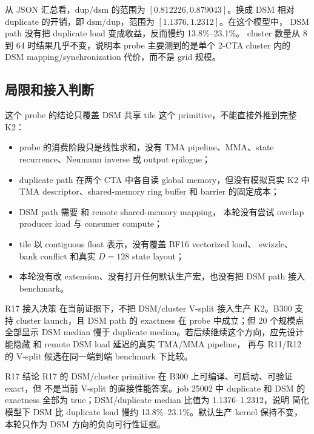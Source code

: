 从 JSON 汇总看，\(\mathrm{dup}/\mathrm{dsm}\) 的范围为
\([0.812226,0.879043]\)。换成 DSM 相对 duplicate 的开销，即
\(\mathrm{dsm}/\mathrm{dup}\)，范围为 \([1.1376,1.2312]\)。在这个模型中，
DSM path 没有把 duplicate load 变成收益，反而慢约 13.8\%--23.1\%。
cluster 数量从 8 到 64 时结果几乎不变，说明本 probe 主要测到的是单个
2-CTA cluster 内的 DSM mapping/synchronization 代价，而不是 grid 规模。

\subsection{局限和接入判断}

这个 probe 的结论只覆盖 DSM 共享 tile 这个 primitive，不能直接外推到完整
\FlashKDA{} K2：

\begin{itemize}
  \item probe 的消费阶段只是线性求和，没有 TMA pipeline、MMA、state
        recurrence、Neumann inverse 或 output epilogue；
  \item duplicate path 在两个 CTA 中各自读 global memory，但没有模拟真实
        K2 中 TMA descriptor、shared-memory ring buffer 和 barrier 的固定成本；
  \item DSM path 需要  和 remote shared-memory mapping，
        本轮没有尝试 overlap producer load 与 consumer compute；
  \item tile 以 contiguous float 表示，没有覆盖 BF16 vectorized load、
        swizzle、bank conflict 和真实 \(D=128\) state layout；
  \item 本轮没有改 \FlashKDA{} extension、没有打开任何默认生产宏，也没有把
        DSM path 接入 benchmark。
\end{itemize}

\begin{decision}{R17 接入决策}
在当前证据下，不把 DSM/cluster V-split 接入生产 K2。B300 支持 cluster
launch，且 DSM path 的 exactness 在 probe 中成立；但 20 个规模点全部显示
DSM median 慢于 duplicate median。若后续继续这个方向，应先设计能隐藏
 和 remote DSM load 延迟的真实 TMA/MMA pipeline，
再与 R11/R12 的 V-split 候选在同一端到端 benchmark 下比较。
\end{decision}

\begin{record}{R17 结论}
R17 的 DSM/cluster primitive 在 B300 上可编译、可启动、可验证 exact，但
不是当前 V-split 的直接性能答案。job 25002 中 duplicate 和 DSM 的
exactness 全部为 true；DSM/duplicate median 比值为 1.1376--1.2312，说明
简化模型下 DSM 比 duplicate load 慢约 13.8\%--23.1\%。默认生产 kernel
保持不变，本轮只作为 DSM 方向的负向可行性证据。
\end{record}
